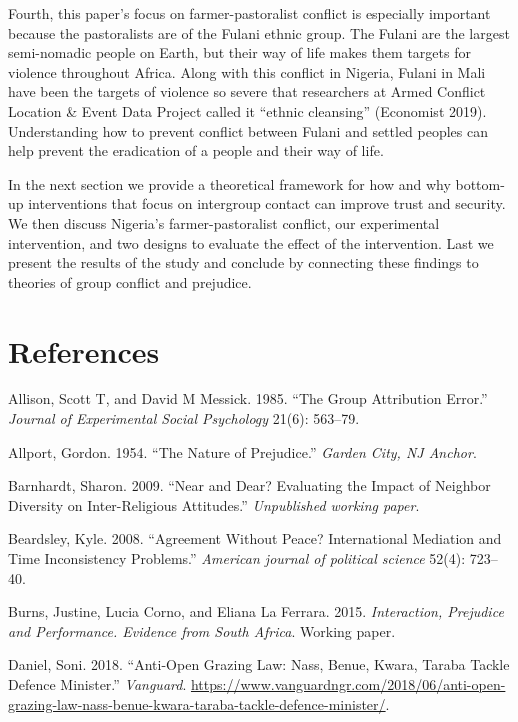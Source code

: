 \documentclass[11pt]{article}
\begin{document}
Fourth, this paper's focus on farmer-pastoralist conflict is especially
important because the pastoralists are of the Fulani ethnic group. The
Fulani are the largest semi-nomadic people on Earth, but their way of
life makes them targets for violence throughout Africa. Along with this
conflict in Nigeria, Fulani in Mali have been the targets of violence so
severe that researchers at Armed Conflict Location \& Event Data Project
called it ``ethnic cleansing'' (Economist 2019). Understanding how to
prevent conflict between Fulani and settled peoples can help prevent the
eradication of a people and their way of life.

In the next section we provide a theoretical framework for how and why
bottom-up interventions that focus on intergroup contact can improve
trust and security. We then discuss Nigeria's farmer-pastoralist
conflict, our experimental intervention, and two designs to evaluate the
effect of the intervention. Last we present the results of the study and
conclude by connecting these findings to theories of group conflict and
prejudice.

\section*{References}\label{references}

\hypertarget{refs}{}
\hypertarget{ref-allison1985group}{}
Allison, Scott T, and David M Messick. 1985. ``The Group Attribution
Error.'' \emph{Journal of Experimental Social Psychology} 21(6):
563--79.

\hypertarget{ref-allport1954prejudice}{}
Allport, Gordon. 1954. ``The Nature of Prejudice.'' \emph{Garden City,
NJ Anchor}.

\hypertarget{ref-barnhardt2009near}{}
Barnhardt, Sharon. 2009. ``Near and Dear? Evaluating the Impact of
Neighbor Diversity on Inter-Religious Attitudes.'' \emph{Unpublished
working paper}.

\hypertarget{ref-beardsley2008agreement}{}
Beardsley, Kyle. 2008. ``Agreement Without Peace? International
Mediation and Time Inconsistency Problems.'' \emph{American journal of
political science} 52(4): 723--40.

\hypertarget{ref-burns2015interaction}{}
Burns, Justine, Lucia Corno, and Eliana La Ferrara. 2015.
\emph{Interaction, Prejudice and Performance. Evidence from South
Africa}. Working paper.

\hypertarget{ref-daniel2018anti}{}
Daniel, Soni. 2018. ``Anti-Open Grazing Law: Nass, Benue, Kwara, Taraba
Tackle Defence Minister.'' \emph{Vanguard}.
\url{https://www.vanguardngr.com/2018/06/anti-open-grazing-law-nass-benue-kwara-taraba-tackle-defence-minister/}.
\end{document}
